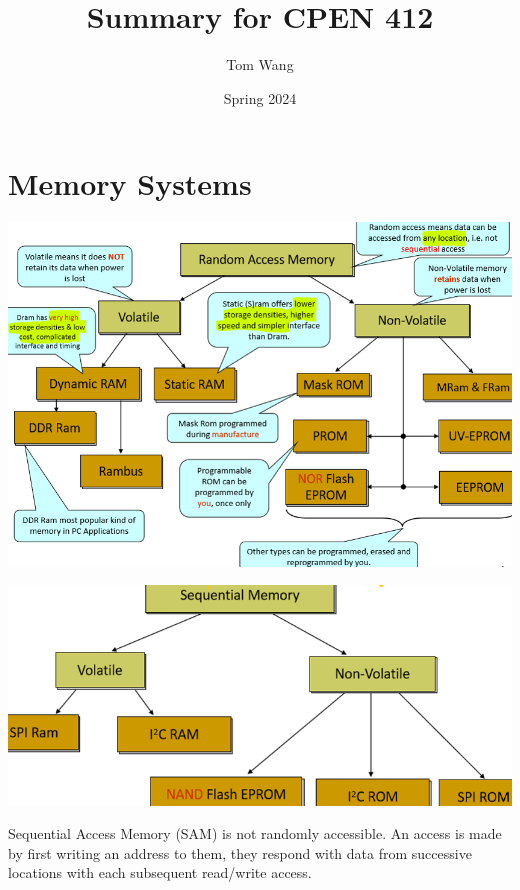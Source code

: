 \documentclass[letterpaper,12pt]{article}
\title{Summary for CPEN 412}
\author{Tom Wang}
\date{Spring 2024}
\begin{document}
\maketitle
\section{Memory Systems}
\includegraphics*[scale = 0.7]{./Images/Classification of Random Access Memory.png}

\includegraphics*[scale = 0.8]{./Images/Classification of Sequential Access Memory.png}

Sequential Access Memory (SAM) is not randomly accessible. An access is made by first writing an address to them, they respond with data from successive locations with each subsequent read/write access.
\end{document}
